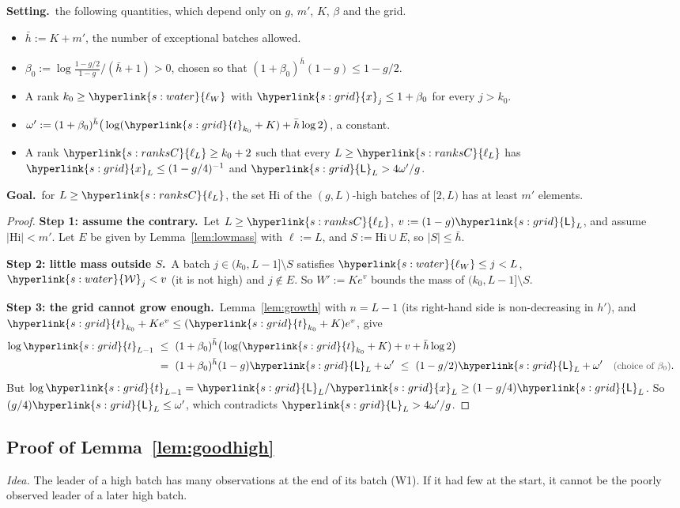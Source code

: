 \documentclass[10pt]{article}
\newcommand{\sy}[2]{{\hyperlink{#1}{#2}}}
\newcommand{\1}{\mathbf{1}}
\newcommand{\tl}{\sy{s:grid}{t}}
\newcommand{\Lg}{\sy{s:grid}{\mathsf L}}
\newcommand{\xg}{\sy{s:grid}{x}}
\newcommand{\lonez}{\sy{s:ranksC}{\ell_L}}
\newcommand{\Lam}{\sy{s:water}{\mathcal W}}
\newcommand{\lW}{\sy{s:water}{\ell_W}}
\newcommand{\Setting}{\noindent\textbf{Setting.}\ }
\newcommand{\Goal}{\par\smallskip\noindent\textbf{Goal.}\ }
\newcommand{\stp}[2]{\par\medskip\noindent\textbf{Step #1: #2.}\ }
\newcommand{\why}[1]{\text{\small\color{black!70}(#1)}}
\begin{document}
\begin{setgoal}
\Setting the following quantities, which depend only on $g$, $m'$, $K$, $\beta$ and the grid.
\begin{itemize}
\item $\bar h:=K+m'$, the number of exceptional batches allowed.
\item $\beta_0:=\log\frac{1-g/2}{1-g}\big/(\bar h+1)>0$, chosen so that $(1+\beta_0)^{\bar h}(1-g)\le1-g/2$.
\item A rank $k_0\ge\lW$ with $\xg_j\le1+\beta_0$ for every $j>k_0$.
\item $\omega':=(1+\beta_0)^{\bar h}\big(\log(\tl_{k_0}+K)+\bar h\log2\big)$, a constant.
\item A rank $\lonez\ge k_0+2$ such that every $L\ge\lonez$ has $\xg_L\le(1-g/4)^{-1}$ and $\Lg_L>4\omega'/g$.
\end{itemize}
\Goal for $L\ge\lonez$, the set $\mathrm{Hi}$ of the $(g,L)$-high batches of $[2,L)$ has at least $m'$ elements.
\end{setgoal}
\begin{proof}
\stp1{assume the contrary}Let $L\ge\lonez$, $v:=(1-g)\Lg_L$, and assume $|\mathrm{Hi}|<m'$. Let $E$ be given by Lemma~\ref{lem:lowmass} with $\ell:=L$, and $S:=\mathrm{Hi}\cup E$, so
$|S|\le\bar h$.

\stp2{little mass outside $S$}A batch $j\in(k_0,L-1]\setminus S$ satisfies $\lW\le j<L$, $\Lam_j<v$ (it is not high) and $j\notin E$. So $W':=Ke^v$ bounds the mass of
$(k_0,L-1]\setminus S$.

\stp3{the grid cannot grow enough}Lemma~\ref{lem:growth} with $n=L-1$ (its right-hand side is non-decreasing in $h'$), and $\tl_{k_0}+Ke^v\le(\tl_{k_0}+K)e^v$, give
\begin{align*}
\log\tl_{L-1}\ &\le\ (1+\beta_0)^{\bar h}\big(\log(\tl_{k_0}+K)+v+\bar h\log2\big)\\
&=\ (1+\beta_0)^{\bar h}(1-g)\Lg_L+\omega'\ \le\ (1-g/2)\Lg_L+\omega'&&\why{choice of $\beta_0$}.
\end{align*}
But $\log\tl_{L-1}=\Lg_L/\xg_L\ge(1-g/4)\Lg_L$. So $(g/4)\Lg_L\le\omega'$, which contradicts $\Lg_L>4\omega'/g$.
\end{proof}

\subsection{Proof of Lemma~\ref{lem:goodhigh}}\label{sec:pf-lem:goodhigh}
\noindent\emph{Idea.} The leader of a high batch has many observations at the end of its batch (W1). If it had few at the start, it cannot be the poorly observed leader
of a later high batch.
\end{document}

